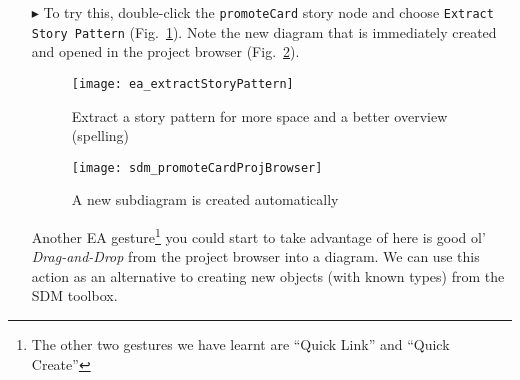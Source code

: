 \begin{itemize}
One great feature of eMolfon (with EA) is a means of coping with large patterns. It might be nice to visualise \emph{small} story patterns directly in their
nodes (such as \texttt{removeCardFromPartition}), but for large patterns or complex control flow, such diagrams would get extremely cumbersome and unwieldy
\emph{very} quickly! This is indeed a popular argument against visual languages and it might have already crossed your mind -- ``This is cute, but it'll
\emph{never} scale!'' With the right tools and concepts however, even huge diagrams can be mastered. eMoflon supports \emph{extracting} story patterns into
their own diagrams, and unless the pattern is really concise with only 2 or 3 object variables, we recommend this course of action. In other words, eMoflon
supports separating your transformation's pattern layer from its imperative control flow layer.

\vspace{0.5cm}

\item[$\blacktriangleright$] To try this, double-click the \texttt{promoteCard} story node and choose \texttt{Extract Story Pattern}
(Fig.~\ref{fig:sdm_check_extract_storypattern}). Note the new diagram that is immediately created and opened in the project browser
(Fig.~\ref{fig:sdm_new_sub_diagram}).

\begin{figure}[htbp]
\begin{center}
  \texttt{[image: ea\_extractStoryPattern]}
  \caption{Extract a story pattern for more space and a better overview \update(spelling)}
  \label{fig:sdm_check_extract_storypattern}
\end{center}
\end{figure}

\begin{figure}[htbp]
\begin{center}
  \texttt{[image: sdm\_promoteCardProjBrowser]}
  \caption{A new subdiagram is created automatically \update}
  \label{fig:sdm_new_sub_diagram}
\end{center}
\end{figure}

\newpage

Another EA gesture\footnote{The other two gestures we have learnt are ``Quick Link'' and ``Quick Create''} you could start to take advantage of here is good
ol' \emph{Drag-and-Drop} from the project browser into a diagram. We can use this action as an alternative to creating new objects (with known types) from
the SDM toolbox.


\end{itemize}
